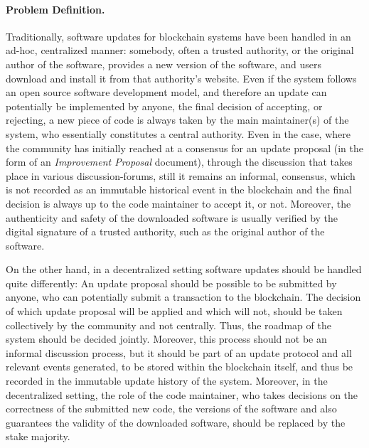 \paragraph{Problem Definition.} 
Traditionally, software updates for blockchain systems have been handled in an ad-hoc, centralized manner: somebody, often a trusted authority, or the original author of the software, provides a new version of the software, and users
download and install it from that authority's website. Even if the system follows an open source software development model, and therefore an update can potentially be implemented by anyone, the final decision of accepting, or rejecting, a new piece of code is always taken by the main maintainer(s) of the system, who essentially constitutes a central authority. Even in the case, where the community has initially reached at a consensus for an update proposal (in the form of an \emph{Improvement Proposal} document), through the discussion that takes place in various discussion-forums, still it remains an informal,  consensus, which is not recorded as an immutable historical event in the blockchain and the final decision is always up to the code maintainer to accept it, or not. Moreover, the authenticity and safety of the downloaded software is usually verified by the digital signature of a trusted authority, such as the original author of the software.

On the other hand, in a decentralized setting software updates should be handled quite differently: An update proposal should be possible to be submitted by anyone, who can potentially submit a transaction to the blockchain. The decision of which update proposal will be applied and which will not, should be taken collectively by the community and not centrally. Thus, the roadmap of the system should be decided jointly. Moreover, this process should not be an informal discussion process, but it should be part of an update protocol and all relevant events generated, to be stored within the blockchain itself, and thus be recorded in the immutable update history of the system. Moreover, in the decentralized setting, the role of the code maintainer, who takes decisions on the correctness of the submitted new code, the versions of the software and also guarantees the validity of the downloaded software, should be replaced by the stake majority. 

